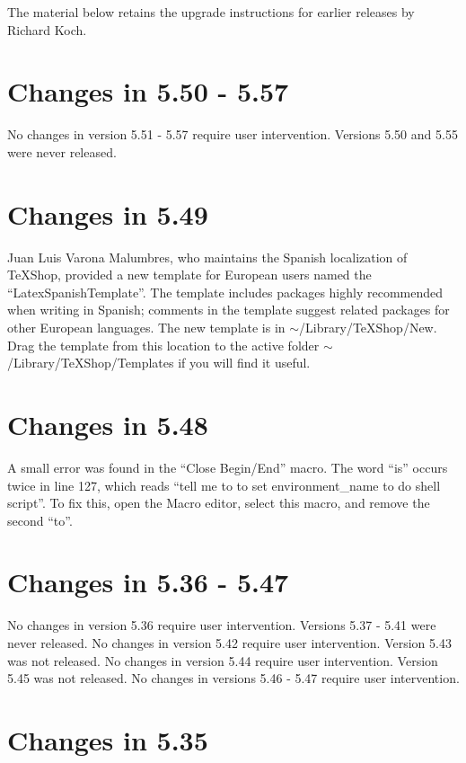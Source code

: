 \documentclass[11pt, oneside]{amsart}
\begin{document}
The material below retains the upgrade instructions for earlier releases by Richard Koch.

\section{Changes in 5.50 - 5.57}

No changes in version 5.51 - 5.57 require user intervention. Versions 5.50 and 5.55 were never released.  

\section{Changes in 5.49}

Juan Luis Varona Malumbres, who maintains the Spanish localization of TeXShop, provided a new template for European users named the ``LatexSpanishTemplate''. The template includes packages highly recommended when writing in Spanish; comments in the template suggest related packages for other European languages. The new template is in $\sim$/Library/TeXShop/New. Drag the template from this location to the active folder $\sim$/Library/TeXShop/Templates if you will find it useful.



\section{Changes in 5.48}

A small error was found in the ``Close Begin/End'' macro. The word ``is'' occurs twice in line 127,
which reads ``tell me to to set environment\_name to do shell script''. To fix this, open the Macro editor,
select this macro, and remove the second ``to''. 

\section{Changes in 5.36 - 5.47}

No changes in version 5.36 require user intervention. Versions 5.37 - 5.41 were never released. No changes in version 5.42 require user intervention. Version 5.43 was not released. No changes in version 5.44 require user intervention.
Version 5.45 was not released. No changes in versions 5.46 - 5.47 require user intervention.

\section{Changes in 5.35}
\end{document}
